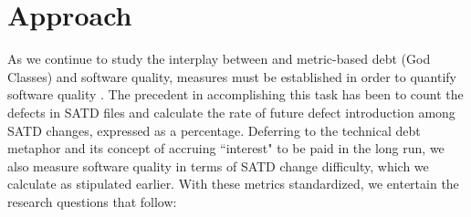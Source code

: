 

\section{Approach}
\label{chap4:sec:approach}
As we continue to study the interplay between \SATD and metric-based debt (God Classes) and software quality, measures must be established in order to quantify software quality \cite{Kamei-tse-2013,Kim-tse-2008,sliwerski-msr-2005}. The precedent in accomplishing this task has been to count the defects in SATD files and calculate the rate of future defect introduction among SATD changes, expressed as a percentage. Deferring to the technical debt metaphor and its concept of accruing ``interest" to be paid in the long run, we also measure software quality in terms of SATD change difficulty, which we calculate as stipulated earlier. With these metrics standardized, we entertain the research questions that follow:

